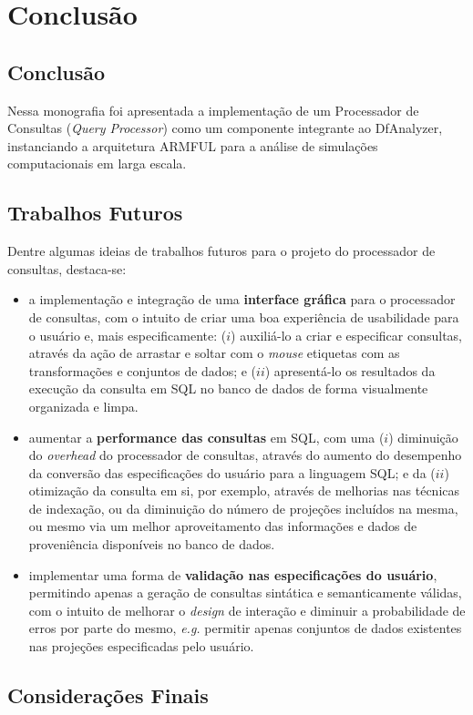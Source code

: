 
\chapter{Conclusão}%
\label{chap:conclusao}

\section{Conclusão}

Nessa monografia foi apresentada a implementação de um Processador de Consultas (\textit{Query Processor}) como um componente integrante ao DfAnalyzer, instanciando a arquitetura ARMFUL para a análise de simulações computacionais em larga escala.


\section{Trabalhos Futuros}

Dentre algumas ideias de trabalhos futuros para o projeto do processador de consultas, destaca-se:

\begin{itemize}
    \item a implementação e integração de uma \textbf{interface gráfica} para o processador de consultas, com o intuito de criar uma boa experiência de usabilidade para o usuário e, mais especificamente: (\(i\)) auxiliá-lo a criar e especificar consultas, através da ação de arrastar e soltar com o \textit{mouse} etiquetas com as transformações e conjuntos de dados; e (\(ii\)) apresentá-lo os resultados da execução da consulta em SQL no banco de dados de forma visualmente organizada e limpa.
    \item aumentar a \textbf{performance das consultas} em SQL, com uma (\(i\)) diminuição do \textit{overhead} do processador de consultas, através do aumento do desempenho da conversão das especificações do usuário para a linguagem SQL; e da (\(ii\)) otimização da consulta em si, por exemplo, através de melhorias nas técnicas de indexação, ou da diminuição do número de projeções incluídos na mesma, ou mesmo via um melhor aproveitamento das informações e dados de proveniência disponíveis no banco de dados.
    \item implementar uma forma de \textbf{validação nas especificações do usuário}, permitindo apenas a geração de consultas sintática e semanticamente válidas, com o intuito de melhorar o \textit{design} de interação e diminuir a probabilidade de erros por parte do mesmo, \textit{e.g.} permitir apenas conjuntos de dados existentes nas projeções especificadas pelo usuário.
\end{itemize}

\section{Considerações Finais}

